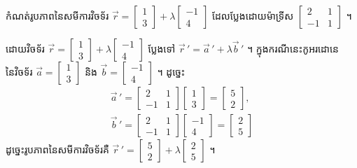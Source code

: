 \begin{example}[លំហាត់គំរូ ៣]
កំណត់រូបភាពនៃសមីការវិចទ័រ $\overrightarrow{r} = \begin{bmatrix} 1\\ 3 \end{bmatrix} + \lambda\begin{bmatrix} -1\\ 4 \end{bmatrix}$ ដែលប្លែងដោយម៉ាទ្រីស $\begin{bmatrix} 2 & 1\\ -1 & 1 \end{bmatrix}$ ។
\end{example}
\ans
ដោយវិចទ័រ $\overrightarrow{r} = \begin{bmatrix} 1\\ 3 \end{bmatrix} + \lambda\begin{bmatrix} -1\\ 4 \end{bmatrix}$ ប្លែងទៅ $\overrightarrow{r}\,' = \overrightarrow{a}\,' + \lambda\overrightarrow{b}\,'$ ។ ក្នុងករណីនេះកូអរដោនេនៃវិចទ័រ $\overrightarrow{a} = \begin{bmatrix} 1\\ 3 \end{bmatrix}$ និង $\overrightarrow{b} = \begin{bmatrix} -1\\ 4 \end{bmatrix}$ ។ ដូច្នេះ
\[
\begin{gathered}
\overrightarrow{a}\,' = \begin{bmatrix} 2 & 1\\ -1 & 1 \end{bmatrix}\begin{bmatrix} 1\\ 3 \end{bmatrix} = \begin{bmatrix} 5\\ 2 \end{bmatrix},\\
\overrightarrow{b}\,' = \begin{bmatrix} 2 & 1\\ -1 & 1 \end{bmatrix}\begin{bmatrix} -1\\ 4 \end{bmatrix} = \begin{bmatrix} 2\\ 5 \end{bmatrix}
\end{gathered}
\]
ដូច្នេះរូបភាពនៃសមីការវិចទ័រគឺ $\overrightarrow{r}\,' = \begin{bmatrix} 5\\ 2 \end{bmatrix} + \lambda\begin{bmatrix} 2\\ 5 \end{bmatrix}$ ។

